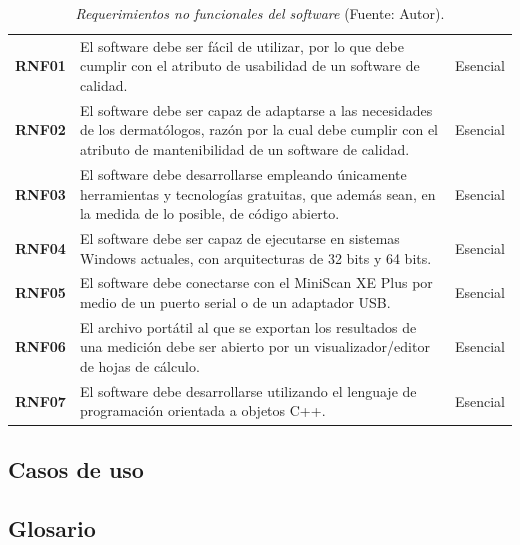 	\begin{table}[h]
		\small
		\caption[Requerimientos no funcionales del software]{\textit{Requerimientos no funcionales del software} (Fuente: Autor).}
		\centering
		\setlength{\extrarowheight}{\altocelda}
		\begin{tabulary}{\anchotabla}{|c|J|c|}
			\hline
			 &  & \\ \hline
			\textbf{RNF01} & El software debe ser f\'{a}cil de utilizar, por lo que debe cumplir con el atributo de usabilidad de un software de calidad. & Esencial\\ \hline
			\textbf{RNF02} & El software debe ser capaz de adaptarse a las necesidades de los dermat\'{o}logos, raz\'{o}n por la cual debe cumplir con el atributo de mantenibilidad de un software de calidad. & Esencial\\ \hline
			\textbf{RNF03} & El software debe desarrollarse empleando \'{u}nicamente herramientas y tecnolog\'{i}as gratuitas, que adem\'{a}s sean, en la medida de lo posible, de c\'{o}digo abierto. & Esencial\\ \hline
			\textbf{RNF04} & El software debe ser capaz de ejecutarse en sistemas Windows actuales, con arquitecturas de 32 bits y 64 bits. & Esencial\\ \hline
			\textbf{RNF05} & El software debe conectarse con el MiniScan XE Plus por medio de un puerto serial o de un adaptador USB. & Esencial\\ \hline
			\textbf{RNF06} & El archivo port\'{a}til al que se exportan los resultados de una medici\'{o}n debe ser abierto por un visualizador/editor de hojas de c\'{a}lculo. & Esencial\\ \hline
			\textbf{RNF07} & El software debe desarrollarse utilizando el lenguaje de programaci\'{o}n orientada a objetos C++. & Esencial\\ \hline
		\end{tabulary}
	\end{table}

\subsection{Casos de uso}

\subsection{Glosario}

